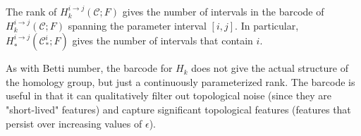 \begin{thm}
The rank of $H_k^{i\to j}(\mathscr{C}; F)$ gives the number of intervals in the barcode of $H_k^{i\to j}(\mathscr{C}; F)$ spanning the parameter interval $[i,j]$. In particular, $H_*^{i\to j}(\mathscr{C}^i_*; F)$ gives the number of intervals that contain $i$.
\begin{rmk}
As with Betti number, the barcode for $H_k$ does not give the actual structure of the homology group, but just a continuously parameterized rank. The barcode is useful in that it can qualitatively filter out topological noise (since they are "short-lived" features) and capture significant topological features (features that persist over increasing values of $\epsilon$).
\end{rmk}
\end{thm}


	


